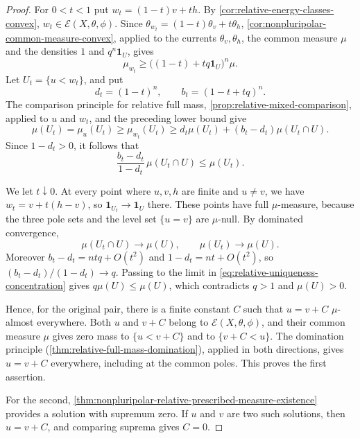 \begin{proof}
For $0<t<1$ put $w_t=(1-t)v+th$. By \cref{cor:relative-energy-classes-convex}, $w_t\in\mathcal E(X,\theta,\phi)$. Since $\theta_{w_t}=(1-t)\theta_v+t\theta_h$, \cref{cor:nonpluripolar-common-measure-convex}, applied to the currents $\theta_v,\theta_h$, the common measure $\mu$ and the densities $1$ and $q^n\mathbf1_U$, gives
\[
 \mu_{w_t}\geq\big((1-t)+tq\mathbf1_U\big)^n\mu.
\]
Let $U_t=\{u<w_t\}$, and put
\[
 d_t=(1-t)^n,\qquad b_t=(1-t+tq)^n.
\]
The comparison principle for relative full mass, \cref{prop:relative-mixed-comparison}, applied to $u$ and $w_t$, and the preceding lower bound give
\[
 \mu(U_t)=\mu_u(U_t)\geq\mu_{w_t}(U_t)
       \geq d_t\mu(U_t)+(b_t-d_t)\mu(U_t\cap U).
\]
Since $1-d_t>0$, it follows that
\begin{equation}\label{eq:relative-uniqueness-concentration}
 \frac{b_t-d_t}{1-d_t}\,\mu(U_t\cap U)\leq\mu(U_t).
\end{equation}

We let $t\downarrow0$. At every point where $u,v,h$ are finite and $u\neq v$, we have $w_t=v+t(h-v)$, so $\mathbf1_{U_t}\to\mathbf1_U$ there. These points have full $\mu$-measure, because the three pole sets and the level set $\{u=v\}$ are $\mu$-null. By dominated convergence,
\[
 \mu(U_t\cap U)\longrightarrow\mu(U),\qquad\mu(U_t)\longrightarrow\mu(U).
\]
Moreover $b_t-d_t=ntq+O(t^2)$ and $1-d_t=nt+O(t^2)$, so $(b_t-d_t)/(1-d_t)\to q$. Passing to the limit in \eqref{eq:relative-uniqueness-concentration} gives $q\mu(U)\leq\mu(U)$, which contradicts $q>1$ and $\mu(U)>0$.

Hence, for the original pair, there is a finite constant $C$ such that $u=v+C$ $\mu$-almost everywhere. Both $u$ and $v+C$ belong to $\mathcal E(X,\theta,\phi)$, and their common measure $\mu$ gives zero mass to $\{u<v+C\}$ and to $\{v+C<u\}$. The domination principle (\cref{thm:relative-full-mass-domination}), applied in both directions, gives $u=v+C$ everywhere, including at the common poles. This proves the first assertion.

For the second, \cref{thm:nonpluripolar-relative-prescribed-measure-existence} provides a solution with supremum zero. If $u$ and $v$ are two such solutions, then $u=v+C$, and comparing suprema gives $C=0$.
\end{proof}
